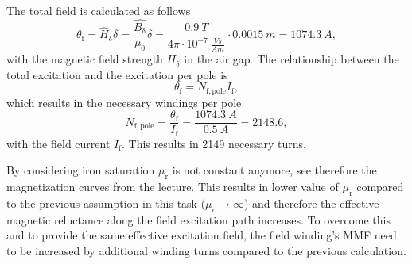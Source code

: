 
\begin{solutionblock}
	The total field is calculated as follows
	\begin{equation}
		\theta_{\mathrm{f}} = \hat{H}_{\updelta} \delta
		= \frac{\hat{B_{\updelta}}}{\mu_{\mathrm{0}}} \delta
		= \frac{0.9 \ \si{T}}{4\pi \cdot 10^{-7} \ \si{\frac{Vs}{Am}}} \cdot 0.0015 \ \si{m}
		= 1074.3 \ \si{A},
	\end{equation}
	with the magnetic field strength $H_{\updelta}$ in the air gap. The relationship between the total excitation and the excitation per pole is
	\begin{equation}
		\theta_{\mathrm{f}} = N_{\mathrm{f,pole}} I_{\mathrm{f}},
	\end{equation}
	which results in the necessary windings per pole
	\begin{equation}
		N_{\mathrm{f,pole}} = \frac{\theta_{\mathrm{f}}}{I_{\mathrm{f}}}
		= \frac{1074.3 \ \si{A}}{0.5 \ \si{A}}
		= 2148.6,
	\end{equation}
	with the field current $I_{\mathrm{f}}$. This results in 2149 necessary turns.

	By considering iron saturation $\mu_{\mathrm{r}}$ is not constant anymore, see therefore the magnetization curves from the lecture.
	This results in lower value of $\mu_{\mathrm{r}}$ compared to the previous assumption in this task ($\mu_{\mathrm{r}}\rightarrow \infty$) and therefore the effective magnetic reluctance along the field excitation path increases. To overcome this and to provide the same effective excitation field, the field winding's MMF need to be increased by additional winding turns compared to the previous calculation.

\end{solutionblock}


